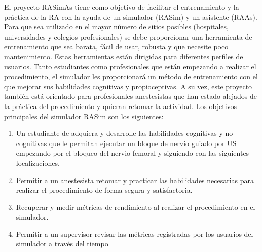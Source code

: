 El proyecto \ac{RASimAs} tiene como objetivo  de facilitar el entrenamiento y la práctica de la \ac{RA} con la ayuda de un simulador (\ac{RASim}) y un asistente (\ac{RAAs}).
Para que sea utilizado en el mayor número de sitios posibles (hospitales, universidades y colegios profesionales) se debe proporcionar una herramienta de entrenamiento que sea barata, fácil de usar, robusta y que necesite poco mantenimiento.
Estas herramientas están dirigidas para diferentes perfiles de usuarios.  Tanto estudiantes como profesionales que están empezando a realizar el procedimiento, el simulador les proporcionará un método de entrenamiento con el que mejorar sus habilidades cognitivas y propioceptivas. A su vez, este proyecto también está orientado para profesionales anestesistas que han estado alejados de la práctica del procedimiento y quieran retomar la actividad.
Los objetivos principales del simulador \ac{RASim} son los siguientes:
\begin{enumerate}
    \item Un estudiante de   adquiera y desarrolle las habilidades cognitivas y no cognitivas que le permitan ejecutar un bloque de nervio guiado por \ac{US} empezando por el bloqueo del nervio femoral y siguiendo con las siguientes localizaciones.
    \item Permitir a un anestesista retomar y practicar las habilidades necesarias para realizar el procedimiento de forma segura y satisfactoria.
    \item Recuperar y medir métricas de rendimiento al realizar el procedimiento en el simulador. 
    \item Permitir a un supervisor revisar las métricas registradas por los usuarios del simulador a través del tiempo
\end{enumerate}



